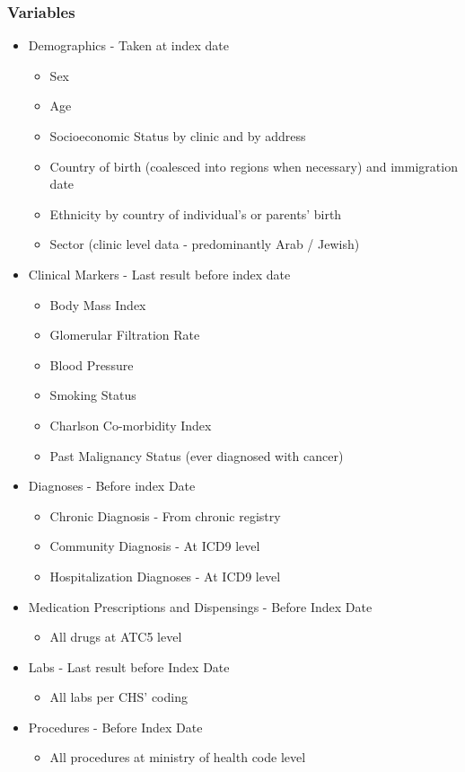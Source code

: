 \documentclass[a4paper,12pt]{article}
\begin{document}
		\subsubsection*{Variables}
		\begin{itemize}
			\item Demographics - Taken at index date
			\begin{itemize}
				\item Sex
				\item Age
				\item Socioeconomic Status by clinic and by address
				\item Country of birth (coalesced into regions when necessary) and immigration date
				\item Ethnicity by country of individual’s or parents’ birth
				\item Sector (clinic level data - predominantly Arab / Jewish)
			\end{itemize}
			\item Clinical Markers - Last result before index date
			\begin{itemize}
				\item Body Mass Index
				\item Glomerular Filtration Rate
				\item Blood Pressure
				\item Smoking Status
				\item Charlson Co-morbidity Index
				\item Past Malignancy Status (ever diagnosed with cancer)
			\end{itemize}
			\item Diagnoses - Before index Date
			\begin{itemize}
				\item Chronic Diagnosis - From chronic registry
				\item Community Diagnosis - At ICD9 level
				\item Hospitalization Diagnoses - At ICD9 level
			\end{itemize}
			\item Medication Prescriptions and Dispensings - Before Index Date
			\begin{itemize}
				\item All drugs at ATC5 level
			\end{itemize}
			\item Labs - Last result before Index Date
			\begin{itemize}
				\item All labs per CHS' coding
			\end{itemize}
			\item Procedures - Before Index Date
			\begin{itemize}
				\item All procedures at ministry of health code level
			\end{itemize}
		\end{itemize}
	
\end{document}
